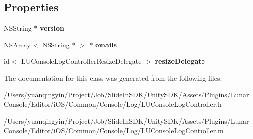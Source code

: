 \subsection*{Properties}
\begin{DoxyCompactItemize}
\item 
\mbox{\label{interface_l_u_console_log_controller_ae5d878aa4ad16d2f8413150e1e6cd08a}} 
N\+S\+String $\ast$ {\bfseries version}
\item 
\mbox{\label{interface_l_u_console_log_controller_a175589c705eefef521fe757141db8b3e}} 
N\+S\+Array$<$ N\+S\+String $\ast$ $>$ $\ast$ {\bfseries emails}
\item 
\mbox{\label{interface_l_u_console_log_controller_ae5fc334dd751aee7efd28c459229e63e}} 
id$<$ L\+U\+Console\+Log\+Controller\+Resize\+Delegate $>$ {\bfseries resize\+Delegate}
\end{DoxyCompactItemize}


The documentation for this class was generated from the following files\+:\begin{DoxyCompactItemize}
\item 
/\+Users/yuanqingyin/\+Project/\+Job/\+Slide\+In\+S\+D\+K/\+Unity\+S\+D\+K/\+Assets/\+Plugins/\+Lunar\+Console/\+Editor/i\+O\+S/\+Common/\+Console/\+Log/L\+U\+Console\+Log\+Controller.\+h\item 
/\+Users/yuanqingyin/\+Project/\+Job/\+Slide\+In\+S\+D\+K/\+Unity\+S\+D\+K/\+Assets/\+Plugins/\+Lunar\+Console/\+Editor/i\+O\+S/\+Common/\+Console/\+Log/L\+U\+Console\+Log\+Controller.\+m\end{DoxyCompactItemize}
